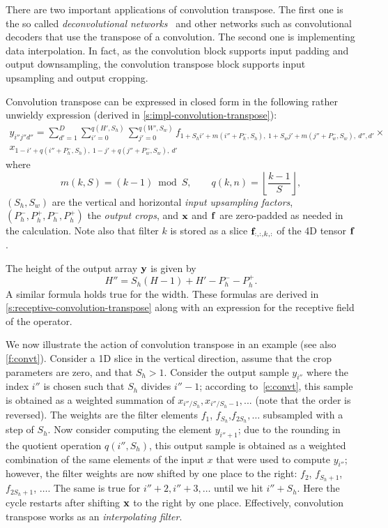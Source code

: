 There are two important applications of convolution transpose. The first one is the so called \emph{deconvolutional networks}~\cite{zeiler14visualizing} and other networks such as convolutional decoders that use the transpose of a convolution. The second one is implementing data interpolation. In fact, as the convolution block supports input padding and output downsampling, the convolution transpose block supports input upsampling and output cropping.

Convolution transpose can be expressed in closed form in the following rather unwieldy expression (derived in \cref{s:impl-convolution-transpose}):
\begin{multline}\label{e:convt}
y_{i''j''d''} =
\sum_{d'=1}^{D}
\sum_{i'=0}^{q(H',S_h)}
\sum_{j'=0}^{q(W',S_w)}
f_{
	1+ S_hi' + m(i''+ P_h^-, S_h),\ %
	1+ S_wj' + m(j''+ P_w^-, S_w),\ %
	d'',
	d'
}
\times \\
x_{
	1 - i' + q(i''+P_h^-,S_h),\ %
	1 - j' + q(j''+P_w^-,S_w),\ %
	d'
}
\end{multline}
where
\[
m(k,S) = (k - 1) \bmod S,
\qquad
q(k,n) = \left\lfloor \frac{k-1}{S} \right\rfloor,
\]
$(S_h,S_w)$ are the vertical and horizontal \emph{input upsampling factors},  $(P_h^-,P_h^+,P_h^-,P_h^+)$ the \emph{output crops}, and $\mathbf{x}$ and $\mathbf{f}$ are zero-padded as needed in the calculation. Note also that filter $k$ is stored as a slice $\mathbf{f}_{:,:,k,:}$ of the 4D tensor $\mathbf{f}$.

The height of the output array $\mathbf{y}$ is given by
\[
H'' = S_h (H - 1) + H' -P^-_h - P^+_h.
\]
A similar formula holds true for the width. These formulas are derived in \cref{s:receptive-convolution-transpose} along with an expression for the receptive field of the operator.

We now illustrate the action of convolution transpose in an example (see also \cref{f:convt}).  Consider a 1D slice in the vertical direction, assume that the crop parameters are zero, and that $S_h>1$. Consider the output sample $y_{i''}$ where the index $i''$ is chosen such that $S_h$ divides $i''-1$; according to~\eqref{e:convt}, this sample is obtained as a weighted summation of $x_{i'' / S_h},x_{i''/S_h-1},...$ (note that the order is reversed). The weights are the filter elements $f_1$, $f_{S_h}$,$f_{2S_h},\dots$ subsampled with a step of $S_h$. Now consider computing the element $y_{i''+1}$; due to the rounding in the quotient operation $q(i'',S_h)$, this output sample is obtained as a weighted combination of the same elements of the input $x$ that were used to compute $y_{i''}$; however, the filter weights are now shifted by one place to the right: $f_2$, $f_{S_h+1}$,$f_{2S_h+1}$, $\dots$. The same is true for $i''+2, i'' + 3,\dots$ until we hit $i'' + S_h$. Here the cycle restarts after shifting $\mathbf{x}$ to the right by one place. Effectively, convolution transpose works as an \emph{interpolating filter}.

